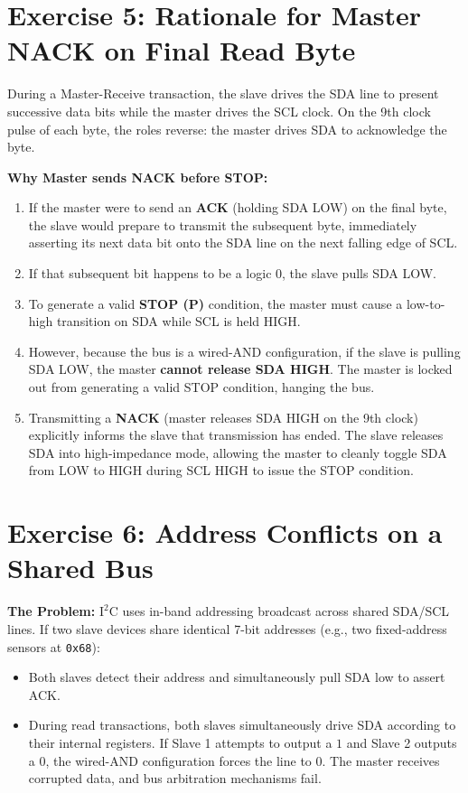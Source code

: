 \documentclass[11pt,a4paper]{article}
\begin{document}
\section*{Exercise 5: Rationale for Master NACK on Final Read Byte}
\begin{theorybox}
During a Master-Receive transaction, the slave drives the SDA line to present successive data bits while the master drives the SCL clock. On the 9th clock pulse of each byte, the roles reverse: the master drives SDA to acknowledge the byte.
\end{theorybox}

\textbf{Why Master sends NACK before STOP:}
\begin{enumerate}
    \item If the master were to send an \textbf{ACK} (holding SDA LOW) on the final byte, the slave would prepare to transmit the subsequent byte, immediately asserting its next data bit onto the SDA line on the next falling edge of SCL.
    \item If that subsequent bit happens to be a logic $0$, the slave pulls SDA LOW.
    \item To generate a valid \textbf{STOP (P)} condition, the master must cause a low-to-high transition on SDA while SCL is held HIGH.
    \item However, because the bus is a wired-AND configuration, if the slave is pulling SDA LOW, the master \textbf{cannot release SDA HIGH}. The master is locked out from generating a valid STOP condition, hanging the bus.
    \item Transmitting a \textbf{NACK} (master releases SDA HIGH on the 9th clock) explicitly informs the slave that transmission has ended. The slave releases SDA into high-impedance mode, allowing the master to cleanly toggle SDA from LOW to HIGH during SCL HIGH to issue the STOP condition.
\end{enumerate}

\section*{Exercise 6: Address Conflicts on a Shared Bus}
\textbf{The Problem:}
$\text{I}^2\text{C}$ uses in-band addressing broadcast across shared SDA/SCL lines. If two slave devices share identical 7-bit addresses (e.g., two fixed-address sensors at \texttt{0x68}):
\begin{itemize}
    \item Both slaves detect their address and simultaneously pull SDA low to assert ACK.
    \item During read transactions, both slaves simultaneously drive SDA according to their internal registers. If Slave 1 attempts to output a $1$ and Slave 2 outputs a $0$, the wired-AND configuration forces the line to $0$. The master receives corrupted data, and bus arbitration mechanisms fail.
\end{itemize}
\end{document}
